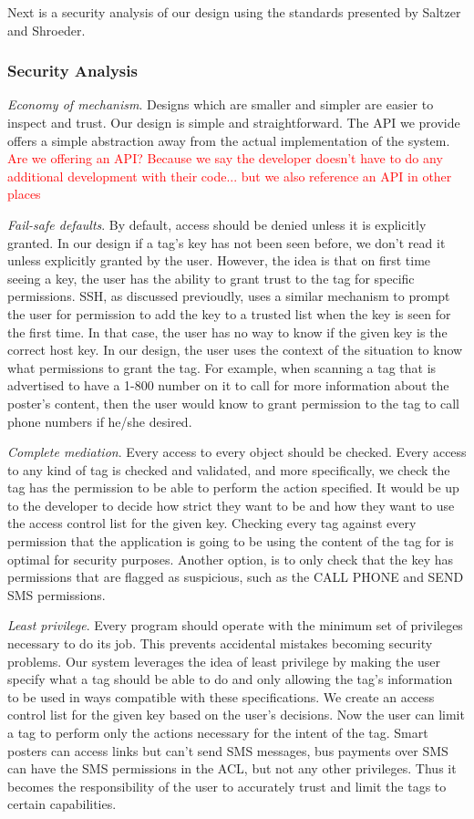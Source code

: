 \documentclass[12pt]{article}
\newcommand\todo[1]{\textcolor{red}{#1}}
\begin{document}
Next is a security analysis of our design using the standards presented by Saltzer and Shroeder.

\subsubsection{Security Analysis}
{\it Economy of mechanism}. Designs which are smaller and simpler are easier to inspect and trust. Our design is simple and straightforward. The API we provide offers a simple abstraction away from the actual implementation of the system. \todo{Are we offering an API? Because we say the developer doesn't have to do any additional development with their code... but we also reference an API in other places}

{\it Fail-safe defaults}. By default, access should be denied unless it is explicitly granted. In our design if a tag’s key has not been seen before, we don’t read it unless explicitly granted by the user. However, the idea is that on first time seeing a key, the user has the ability to grant trust to the tag for specific permissions. SSH, as discussed previoudly, uses a similar mechanism to prompt the user for permission to add the key to a trusted list when the key is seen for the first time. In that case, the user has no way to know if the given key is the correct host key. In our design, the user uses the context of the situation to know what permissions to grant the tag. For example, when scanning a tag that is advertised to have a 1-800 number on it to call for more information about the poster’s content, then the user would know to grant permission to the tag to call phone numbers if he/she desired.

{\it Complete mediation}. Every access to every object should be checked. Every access to any kind of tag is checked and validated, and more specifically, we check the tag has the permission to be able to perform the action specified. It would be up to the developer to decide how strict they want to be and how they want to use the access control list for the given key. Checking every tag against every permission that the application is going to be using the content of the tag for is optimal for security purposes. Another option, is to only check that the key has permissions that are flagged as suspicious, such as the CALL PHONE and SEND SMS permissions.

{\it Least privilege}. Every program should operate with the minimum set of privileges necessary to do its job. This prevents accidental mistakes becoming security problems. Our system leverages the idea of least privilege by making the user specify what a tag should be able to do and only allowing the tag’s information to be used in ways compatible with these specifications. We create an access control list for the given key based on the user’s decisions. Now the user can limit a tag to perform only the actions necessary for the intent of the tag. Smart posters can access links but can’t send SMS messages, bus payments over SMS can have the SMS permissions in the ACL, but not any other privileges. Thus it becomes the responsibility of the user to accurately trust and limit the tags to certain capabilities.
\end{document}
